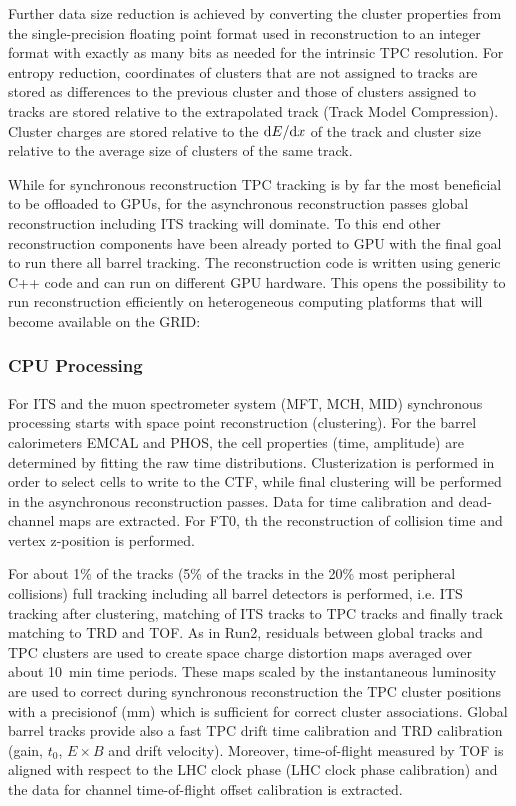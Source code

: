Further data size reduction is achieved by converting the cluster properties from the single-precision 
floating point format used in reconstruction to an integer format with exactly as many bits as needed 
for the intrinsic TPC resolution. For entropy reduction, coordinates of clusters that are not assigned 
to tracks are stored as differences to the previous cluster and those of clusters assigned to tracks 
are stored relative to the extrapolated track (Track Model Compression). Cluster charges are stored 
relative to the ${\rm d}E/{\rm d}x$ of the track and cluster size relative to the average size of 
clusters of the same track.

While for synchronous reconstruction TPC tracking is by far the most beneficial to be offloaded to GPUs, for the 
asynchronous reconstruction passes global reconstruction including ITS tracking will dominate. To this 
end other reconstruction components have been already ported to GPU with the final goal to run there 
all barrel tracking. The reconstruction code is written using generic C++ code and can run on different
GPU hardware. This opens the possibility to run reconstruction efficiently on heterogeneous  
computing platforms that will become available on the GRID:

\subsubsection*{\bf CPU Processing}
For ITS and the muon spectrometer system (MFT, MCH, MID) synchronous processing starts with space point reconstruction (clustering). For the barrel calorimeters EMCAL and PHOS, the cell properties (time, amplitude) are determined by fitting the raw time distributions. Clusterization is performed in order to select cells to write to the CTF, while final clustering will be performed in the asynchronous reconstruction passes. Data for time calibration and dead-channel maps are extracted. For FT0, th the reconstruction of collision time and vertex z-position is performed.

For about 1\% of the tracks (5\% of the tracks in the 20\% most peripheral
collisions) full tracking including all 
barrel detectors is performed, i.e. ITS tracking after clustering, matching of ITS tracks to TPC tracks
and finally track matching to TRD and TOF. As in Run2, residuals between 
global tracks and TPC clusters 
are used to create space charge distortion maps averaged over about 10~min 
time periods. These maps 
scaled by the instantaneous luminosity are used to correct during 
synchronous reconstruction the TPC 
cluster positions with a precisionof (mm) which is sufficient for correct cluster associations.
Global barrel tracks 
provide also a fast TPC drift 
time calibration and TRD calibration (gain, $t_0$, $E \times B$ and drift 
velocity). Moreover, time-of-flight measured by TOF is aligned with respect
to the LHC clock phase (LHC clock phase calibration) and the data for channel 
time-of-flight offset calibration is extracted.


